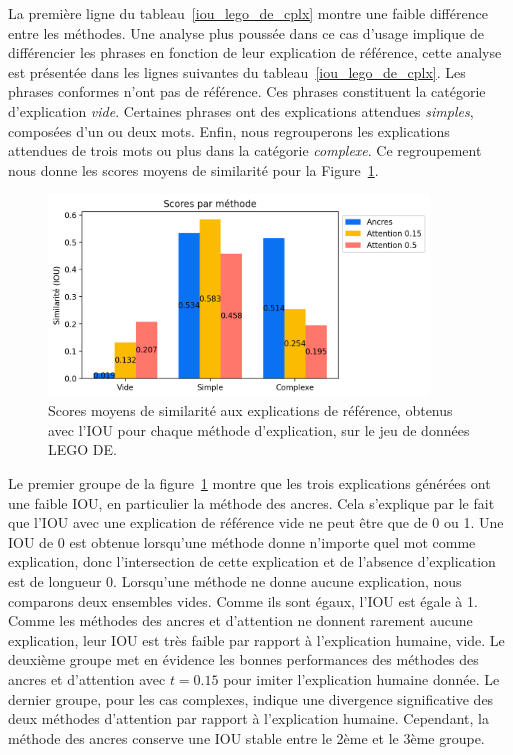 La première ligne du tableau~\ref{iou_lego_de_cplx} montre une faible différence entre les méthodes. Une analyse plus poussée dans ce cas d'usage implique de différencier les phrases en fonction de leur explication de référence, cette analyse est présentée dans les lignes suivantes du tableau~\ref{iou_lego_de_cplx}. Les phrases conformes n'ont pas de référence. Ces phrases constituent la catégorie d'explication \textit{vide}. Certaines phrases ont des explications attendues \textit{simples}, composées d'un ou deux mots. Enfin, nous regrouperons les explications attendues de trois mots ou plus dans la catégorie \textit{complexe}. Ce regroupement nous donne les scores moyens de similarité pour la Figure~\ref{fig:iou_plot_cplx}.

\begin{figure}[h!tpb]
  \setlength{\belowcaptionskip}{-20pt}
 \begin{center}
  \includegraphics[width=0.9\textwidth]{S3-Comparaison_de_methodes/figures/iou_by_complexity.png}
  \caption{Scores moyens de similarité aux explications de référence, obtenus avec l'IOU pour chaque méthode d'explication, sur le jeu de données LEGO DE.} \label{fig:iou_plot_cplx}
 \end{center}
\end{figure}

Le premier groupe de la figure~\ref{fig:iou_plot_cplx} montre que les trois explications générées ont une faible IOU, en particulier la méthode des ancres. Cela s'explique par le fait que l'IOU avec une explication de référence vide ne peut être que de 0 ou 1. Une IOU de 0 est obtenue lorsqu'une méthode donne n'importe quel mot comme explication, donc l'intersection de cette explication et de l'absence d'explication est de longueur 0. Lorsqu'une méthode ne donne aucune explication, nous comparons deux ensembles vides. Comme ils sont égaux, l'IOU est égale à 1. Comme les méthodes des ancres et d'attention ne donnent rarement aucune explication, leur IOU est très faible par rapport à l'explication humaine, vide.
Le deuxième groupe met en évidence les bonnes performances des méthodes des ancres et d'attention avec $t=0.15$ pour imiter l'explication humaine donnée. Le dernier groupe, pour les cas complexes, indique une divergence significative des deux méthodes d'attention par rapport à l'explication humaine. Cependant, la méthode des ancres conserve une IOU stable entre le 2ème et le 3ème groupe.

